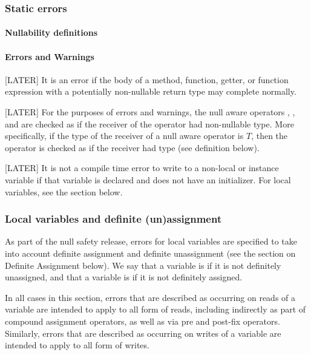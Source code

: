 \documentclass[makeidx]{article}
\begin{document}
{%

\subsubsection{Static errors}

\paragraph{Nullability definitions}

\paragraph{Errors and Warnings}

[LATER] It is an error if the body of a method, function, getter, or
function expression with a potentially non-nullable return type may
complete normally.

[LATER] For the purposes of errors and warnings, the null aware
operators , , and  are checked as if the
receiver of the operator had non-nullable type.  More specifically, if
the type of the receiver of a null aware operator is $T$, then the
operator is checked as if the receiver had type 
(see definition below).

[LATER] It is not a compile time error to write to a \FINAL{}
non-local or instance variable if that variable is declared \LATE{}
and does not have an initializer.  For local variables, see the
section below.

\subsubsection{Local variables and definite (un)assignment}

As part of the null safety release, errors for local variables are specified to
take into account definite assignment and definite unassignment (see the
section on Definite Assignment below).  We say that a variable is
if it is not definitely unassigned, and that a variable is
 if it is not definitely assigned.

In all cases in this section, errors that are described as occurring on reads of
a variable are intended to apply to all form of reads, including indirectly as
part of compound assignment operators, as well as via pre and post-fix
operators.  Similarly, errors that are described as occurring on writes of a
variable are intended to apply to all form of writes.

}
\end{document}
